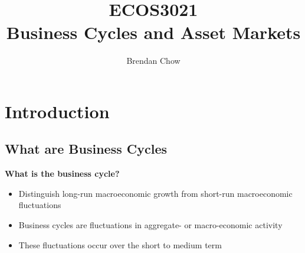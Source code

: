 \documentclass{article}
\numberwithin{equation}{section}
\numberwithin{figure}{section}
\begin{document}
\title{{ECOS3021}\\{\normalsize{Business Cycles and Asset Markets}}}
	\author{Brendan Chow}
	\maketitle
	\newpage
	\pagestyle{fancynotes}

\section{Introduction}\label{Sec:1}
\subsection{What are Business Cycles}
	\textbf{What is the business cycle?}
	\begin{itemize}
		\item Distinguish \textcolor{myred}{long-run} macroeconomic \textcolor{myred}{growth} from \textcolor{myblue}{short-run} macroeconomic \textcolor{myblue}{fluctuations}
		\item Business cycles are \textcolor{myblue}{fluctuations} in aggregate- or macro-economic activity
		\item These fluctuations occur over the \textcolor{myblue}{short to medium} term
	\end{itemize}
\end{document}
